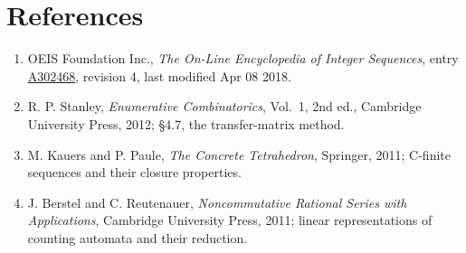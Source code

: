 \documentclass[11pt]{article}
\theoremstyle{definition}
\begin{document}
\section{References}

\begin{enumerate}

\item OEIS Foundation Inc., \emph{The On-Line Encyclopedia of Integer Sequences}, entry \href{https://oeis.org/A302468}{A302468}, revision 4, last modified Apr 08 2018.

\item R. P. Stanley, \emph{Enumerative Combinatorics}, Vol.~1, 2nd ed., Cambridge University Press, 2012; \S4.7, the transfer-matrix method.

\item M. Kauers and P. Paule, \emph{The Concrete Tetrahedron}, Springer, 2011; C-finite sequences and their closure properties.

\item J. Berstel and C. Reutenauer, \emph{Noncommutative Rational Series with Applications}, Cambridge University Press, 2011; linear representations of counting automata and their reduction.

\end{enumerate}
\end{document}
